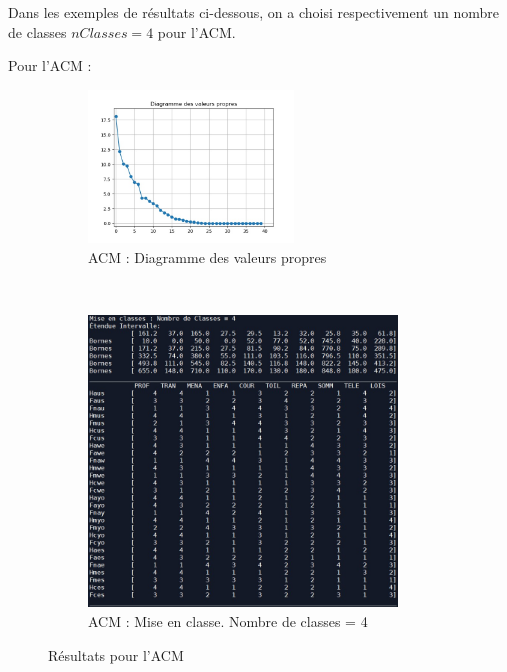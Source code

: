 Dans les exemples de résultats ci-dessous, on a choisi respectivement un nombre de classes $nClasses = 4$ pour l'ACM.

Pour l'ACM :

\begin{figure}[!htb]
        \begin{subfigure}[b]{1.0\textwidth}
            \centering
            \includegraphics[width=0.6\textwidth]{img/mixte_acm_cah/diagramme_des_valeurs_propres.jpg}
            \caption{ACM : Diagramme des valeurs propres}
            \label{Label_diagramme_des_valeurs_propres.jpg}
        \end{subfigure}
        \\
        \begin{subfigure}[b]{1.0\textwidth}
            \centering
            \includegraphics[width=0.9\textwidth]{img/mixte_acm_cah/mise_en_classe_4.jpg}
            \caption{ACM : Mise en classe. Nombre de classes = 4}
            \label{Label_mise_en_classe_4.jpg}
        \end{subfigure}
        \caption{Résultats pour l'ACM}
    \end{figure}
    
